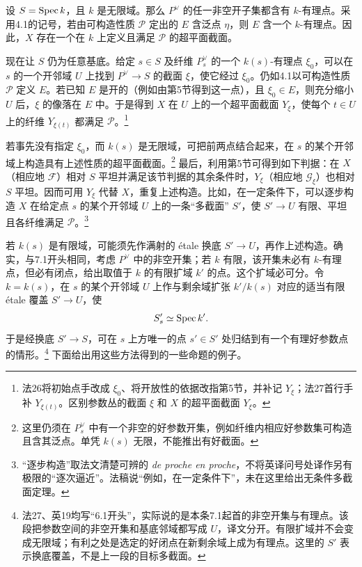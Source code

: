 \begingroup
\def\OO{\mathcal O}\def\FF{\mathcal F}\def\GG{\mathcal G}
\def\PP{\mathbf P}\def\calP{\mathcal P}\def\dd{\delta}
\def\Div{\operatorname{Div}}\def\depth{\operatorname{depth}}
\def\pr{\operatorname{pr}}\def\coker{\operatorname{coker}}

设 $S=\operatorname{Spec} k$，且 $k$ 是无限域。那么 $P^\vee$ 的任一非空开子集都含有 $k$-有理点。采用4.1的记号，若由可构造性质 $\calP$ 定出的 $E$ 含泛点 $\eta$，则 $E$ 含一个 $k$-有理点。因此，$X$ 存在一个在 $k$ 上定义且满足 $\calP$ 的超平面截面。

现在让 $S$ 仍为任意基底。给定 $s\in S$ 及纤维 $P^\vee_s$ 的一个 $k(s)$-有理点 $\xi_0$，可以在 $s$ 的一个开邻域 $U$ 上找到 $P^\vee\to S$ 的截面 $\xi$，使它经过 $\xi_0$。仍如4.1以可构造性质 $\calP$ 定义 $E$。若已知 $E$ 是开的（例如由第5节得到这一点），且 $\xi_0\in E$，则充分缩小 $U$ 后，$\xi$ 的像落在 $E$ 中。于是得到 $X$ 在 $U$ 上的一个超平面截面 $Y_\xi$，使每个 $t\in U$ 上的纤维 $Y_{\xi(t)}$ 都满足 $\calP$。\footnote{法26将初始点手改成 $\xi_0$、将开放性的依据改指第5节，并补记 $Y_\xi$；法27首行手补 $Y_{\xi(t)}$。区别参数丛的截面 $\xi$ 和 $X$ 的超平面截面 $Y_\xi$。}

若事先没有指定 $\xi_0$，而 $k(s)$ 是无限域，可把前两点结合起来，在 $s$ 的某个开邻域上构造具有上述性质的超平面截面。\footnote{这里仍须在 $P^\vee_s$ 中有一个非空的好参数开集，例如纤维内相应好参数集可构造且含其泛点。单凭 $k(s)$ 无限，不能推出有好截面。}
最后，利用第5节可得到如下判据：在 $X$（相应地 $\FF$）相对 $S$ 平坦并满足该节判据的其余条件时，$Y_\xi$（相应地 $\GG_\xi$）也相对 $S$ 平坦。因而可用 $Y_\xi$ 代替 $X$，重复上述构造。比如，在一定条件下，可以逐步构造 $X$ 在给定点 $s$ 的某个开邻域 $U$ 上的一条“多截面” $S'$，使 $S'\to U$ 有限、平坦且各纤维满足 $\calP$。\footnote{“逐步构造”取法文清楚可辨的 \emph{de proche en proche}，不将英译问号处译作另有极限的“逐次逼近”。法稿说“例如，在一定条件下”，未在这里给出无条件多截面定理。}

若 $k(s)$ 是有限域，可能须先作满射的 étale 换底 $S'\to U$，再作上述构造。确实，与7.1开头相同，考虑 $P^\vee$ 中的非空开集；若 $k$ 有限，该开集未必有 $k$-有理点，但必有闭点，给出取值于 $k$ 的有限扩域 $k'$ 的点。这个扩域必可分。令 $k=k(s)$，在 $s$ 的某个开邻域 $U$ 上作与剩余域扩张 $k'/k(s)$ 对应的适当有限 étale 覆盖 $S'\to U$，使
\[
 S'_s\simeq\operatorname{Spec} k'.
\]
于是经换底 $S'\to S$，可在 $s$ 上方唯一的点 $s'\in S'$ 处归结到有一个有理好参数点的情形。\footnote{法27、英19均写“6.1开头”，实际说的是本条7.1起首的非空开集与有理点。该段把参数空间的非空开集和基底邻域都写成 $U$，译文分开。有限扩域并不会变成无限域；有利之处是选定的好闭点在新剩余域上成为有理点。这里的 $S'$ 表示换底覆盖，不是上一段的目标多截面。}
下面给出用这些方法得到的一些命题的例子。

